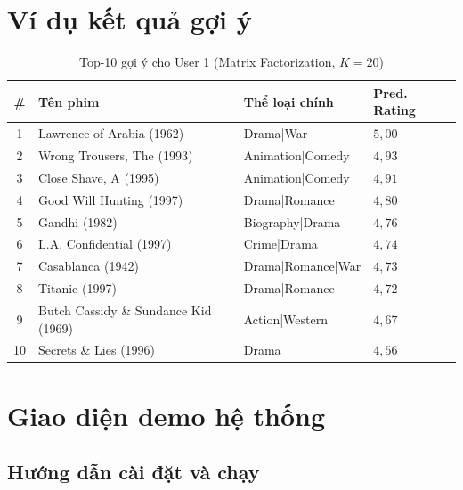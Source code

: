 ﻿\documentclass[../BTL.tex]{subfiles}
\begin{document}
\section{Ví dụ kết quả gợi ý}
\label{section:3.8}

\begin{table}[H]
    \centering
    \caption{Top-10 gợi ý cho User 1 (Matrix Factorization, $K=20$)}
    \label{tab:top10}
    \begin{tabular}{clll}
        \toprule
        \textbf{\#} & \textbf{Tên phim}
            & \textbf{Thể loại chính} & \textbf{Pred. Rating} \\
        \midrule
        1  & Lawrence of Arabia (1962)
           & Drama|War             & $5{,}00$ \\
        2  & Wrong Trousers, The (1993)
           & Animation|Comedy      & $4{,}93$ \\
        3  & Close Shave, A (1995)
           & Animation|Comedy      & $4{,}91$ \\
        4  & Good Will Hunting (1997)
           & Drama|Romance         & $4{,}80$ \\
        5  & Gandhi (1982)
           & Biography|Drama       & $4{,}76$ \\
        6  & L.A. Confidential (1997)
           & Crime|Drama           & $4{,}74$ \\
        7  & Casablanca (1942)
           & Drama|Romance|War     & $4{,}73$ \\
        8  & Titanic (1997)
           & Drama|Romance         & $4{,}72$ \\
        9  & Butch Cassidy \& Sundance Kid (1969)
           & Action|Western        & $4{,}67$ \\
        10 & Secrets \& Lies (1996)
           & Drama                 & $4{,}56$ \\
        \bottomrule
    \end{tabular}
\end{table}

\section{Giao diện demo hệ thống}
\label{section:3.9}

\subsection{Hướng dẫn cài đặt và chạy}
\label{section:3.9.1}
\end{document}
